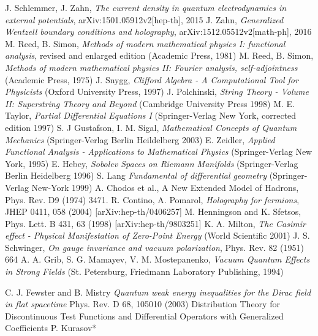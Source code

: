 \documentclass[11pt, oneside]{report}   	%
\title{}
\author{}
\theoremstyle{remark}
\begin{document}

%



\begin{thebibliography}{9}
 J. Schlemmer, J. Zahn, \textit{The current density in quantum electrodynamics in external potentials}, arXiv:1501.05912v2[hep-th], 2015
 J. Zahn, \textit{Generalized Wentzell boundary conditions and holography}, arXiv:1512.05512v2[math-ph], 2016
 M. Reed, B. Simon, \textit{Methods of modern mathematical physics I: functional analysis}, revised and enlarged edition (Academic Press, 1981)
 M. Reed, B. Simon, \textit{Methods of modern mathematical physics II: Fourier analysis, self-adjointness} (Academic Press, 1975)
 J. Snygg, \textit{Clifford Algebra - A Computational Tool for Physicists} (Oxford University Press, 1997)
 J. Polchinski, \textit{String Theory - Volume II: Superstring Theory and Beyond} (Cambridge University Press 1998)
 M. E. Taylor, \textit{Partial Differential Equations I} (Springer-Verlag New York, corrected edition 1997)
 S. J Gustafson, I. M. Sigal, \textit{Mathematical Concepts of Quantum Mechanics} (Springer-Verlag Berlin Heildelberg 2003)
 E. Zeidler, \textit{Applied Functional Analysis - Applications to Mathematical Physics} (Springer-Verlag New York, 1995)
 E. Hebey, \textit{Sobolev Spaces on Riemann Manifolds} (Springer-Verlag Berlin Heidelberg 1996)
 S. Lang \textit{Fundamental of differential geometry} (Springer-Verlag New-York 1999)
 A. Chodos et al., A New Extended Model of Hadrons, Phys. Rev. D9 (1974) 3471.
 R. Contino, A. Pomarol, \textit{Holography for fermions}, JHEP 0411, 058 (2004) [arXiv:hep-th/0406257]
 M. Henningson and K. Sfetsos, Phys. Lett. B 431, 63 (1998) [arXiv:hep-th/9803251]
 K. A. Milton, \textit{The Casimir effect - Physical Manifestation of Zero-Point Energy} (World Scientific 2001)
 J. S. Schwinger, \textit{On gauge invariance and vacuum polarization}, Phys. Rev. 82 (1951) 664
 A. A. Grib, S. G. Mamayev, V. M. Mostepanenko, \textit{Vacuum Quantum Effects in Strong Fields} (St. Petersburg, Friedmann Laboratory Publishing, 1994)\end{thebibliography}
C. J. Fewster and B. Mistry \textit{Quantum weak energy inequalities for the Dirac field in flat spacetime}
Phys. Rev. D 68, 105010 (2003) 
Distribution Theory for Discontinuous Test Functions and Differential Operators with Generalized Coefficients
P. Kurasov*
\end{document}
